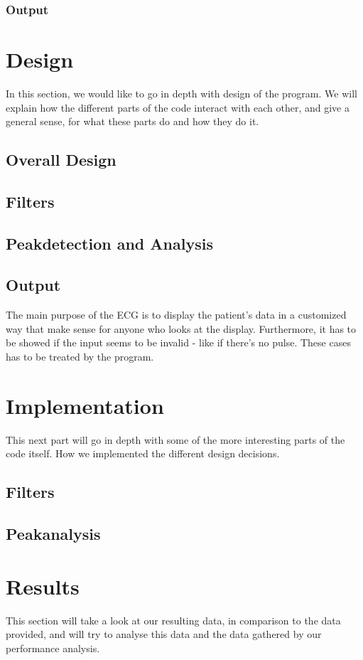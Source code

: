 \documentclass[12pt, danish, a4paper, titlepage]{article}
\begin{document}
			\subsubsection{Output}
			
	\section{Design}
	In this section, we would like to go in depth with design of the program. We will explain how the different parts of the code interact with each other, and give a general sense, for what these parts do and how they do it.
		\subsection{Overall Design}
		\subsection{Filters}
		\subsection{Peakdetection and Analysis}
		\subsection{Output}
			The main purpose of the ECG is to display the patient's data in a customized way that make sense for anyone who looks at the display. Furthermore, it has to be showed if the input seems to be invalid - like if there's no pulse. These cases has to be treated by the program.
		
	\section{Implementation}
	This next part will go in depth with some of the more interesting parts of the code itself. How we implemented the different design decisions.  
		\subsection{Filters}
		\subsection{Peakanalysis}
		
	\section{Results}
	This section will take a look at our resulting data, in comparison to the data provided, and will try to analyse this data and the data gathered by our performance analysis. 
\end{document}
